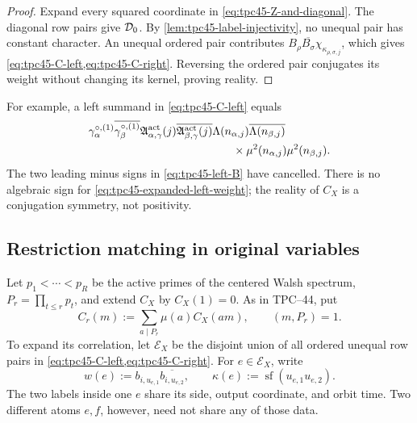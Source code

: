 \begin{proof}
Expand every squared coordinate in
\eqref{eq:tpc45-Z-and-diagonal}.  The diagonal row pairs give
\(\mathcal D_0\).  By \cref{lem:tpc45-label-injectivity}, no unequal pair has
constant character.  An unequal ordered pair contributes
\(B_\rho\overline{B_\sigma}\chi_{\kappa_{\rho,\sigma,j}}\), which gives
\cref{eq:tpc45-C-left,eq:tpc45-C-right}.  Reversing the ordered pair
conjugates its weight without changing its kernel, proving reality.
\end{proof}

For example, a left summand in \eqref{eq:tpc45-C-left} equals
\begin{align}
 &\gamma_\alpha^{\circ,(1)}
  \overline{\gamma_\beta^{\circ,(1)}}
  \mathfrak A_{\alpha,\gamma}^{\rm act}(j)
  \overline{\mathfrak A_{\beta,\gamma}^{\rm act}(j)}
  \Lambda(n_{\alpha,j})\overline{\Lambda(n_{\beta,j})}
 \notag\\
 &\hspace{45mm}\times
  \mu^2(n_{\alpha,j})\mu^2(n_{\beta,j}).
 \label{eq:tpc45-expanded-left-weight}
\end{align}
The two leading minus signs in \eqref{eq:tpc45-left-B} have cancelled.
There is no algebraic sign for
\eqref{eq:tpc45-expanded-left-weight}; the reality of \(C_X\) is a
conjugation symmetry, not positivity.

\subsection{Restriction matching in original variables}

Let \(p_1<\cdots<p_R\) be the active primes of the centered Walsh
spectrum, \(P_r=\prod_{t\le r}p_t\), and extend \(C_X\) by
\(C_X(1)=0\).  As in TPC--44, put
\begin{equation}
 C_r(m):=\sum_{a\mid P_r}\mu(a)C_X(am),
 \qquad (m,P_r)=1.
 \label{eq:tpc45-Cr}
\end{equation}
To expand its correlation, let \(\mathscr E_X\) be the disjoint union
of all ordered unequal row pairs in
\cref{eq:tpc45-C-left,eq:tpc45-C-right}.  For \(e\in\mathscr E_X\),
write
\begin{equation}
 w(e):=b_{i,u_{e,1}}\overline{b_{i,u_{e,2}}},
 \qquad
 \kappa(e):=\operatorname{sf}(u_{e,1}u_{e,2}).
 \label{eq:tpc45-cross-atom}
\end{equation}
The two labels inside one \(e\) share its side, output coordinate, and
orbit time.  Two different atoms \(e,f\), however, need not share any
of those data.

